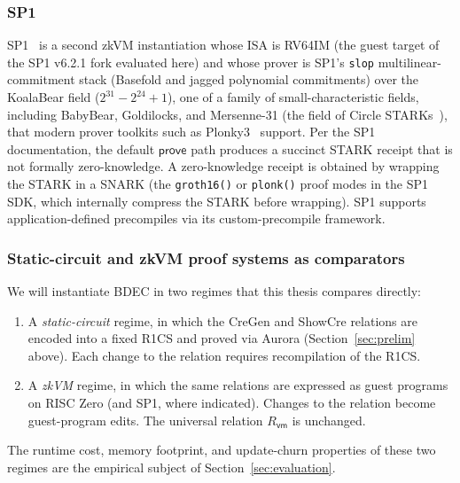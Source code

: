 \subsubsection{SP1}
SP1~\cite{succinct2024sp1} is a second zkVM instantiation whose ISA is RV64IM (the guest target of the SP1 v6.2.1 fork evaluated here) and whose prover is SP1's \texttt{slop} multilinear-commitment stack (Basefold and jagged polynomial commitments) over the KoalaBear field ($2^{31}-2^{24}+1$), one of a family of small-characteristic fields, including BabyBear, Goldilocks, and Mersenne-31 (the field of Circle STARKs~\cite{circlestarks2024}), that modern prover toolkits such as Plonky3~\cite{plonky3} support. Per the SP1 documentation, the default $\mathsf{prove}$ path produces a succinct STARK receipt that is not formally zero-knowledge. A zero-knowledge receipt is obtained by wrapping the STARK in a SNARK (the \texttt{groth16()} or \texttt{plonk()} proof modes in the SP1 SDK, which internally compress the STARK before wrapping). SP1 supports application-defined precompiles via its custom-precompile framework.

\subsubsection{Static-circuit and zkVM proof systems as comparators}
We will instantiate BDEC in two regimes that this thesis compares directly:
\begin{enumerate}
  \item A \emph{static-circuit} regime, in which the CreGen and ShowCre relations are encoded into a fixed R1CS and proved via Aurora (Section~\ref{sec:prelim} above). Each change to the relation requires recompilation of the R1CS.
  \item A \emph{zkVM} regime, in which the same relations are expressed as guest programs on RISC Zero (and SP1, where indicated). Changes to the relation become guest-program edits. The universal relation $R_{\mathsf{vm}}$ is unchanged.
\end{enumerate}
The runtime cost, memory footprint, and update-churn properties of these two regimes are the empirical subject of Section~\ref{sec:evaluation}.